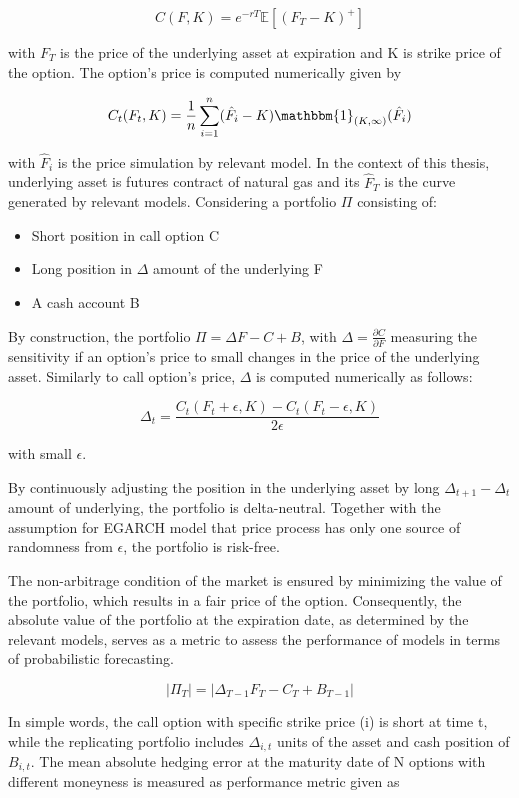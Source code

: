 \documentclass[12pt,a4paper]{article}
\numberwithin{equation}{section}
\begin{document}
\[C(F, K) = e^{-rT} \mathbb{E} \left[(F_T - K)^+ \right] \]

with $F_T$ is the price of the underlying asset at expiration and K is strike price of the option. The option's price is computed numerically given by

\[C_t(F_t, K) = \frac{1}{n} \sum_{i=1}^n (\hat{F}_i  - K)\mathbbm{1}_{(K, \infty)}(\hat{F}_i) \]

with $\hat{F}_i$ is the price simulation by relevant model.
In the context of this thesis, underlying asset is futures contract of natural gas and its $\hat{F}_T$ is the curve generated by relevant models. Considering a portfolio $\Pi$ consisting of: 

\begin{itemize}
\item Short position in call option C
\item Long position in $\Delta$ amount of the underlying F
\item A cash account B
\end{itemize}

By construction, the portfolio $\Pi = \Delta F - C + B$, with $\Delta = \frac{\partial C}{\partial F}$ measuring the sensitivity if an option's price to small changes in the price of the underlying asset. Similarly to call option's price, $\Delta$ is computed numerically as follows:

\[\Delta_t = \frac{C_t(F_t+\epsilon, K) - C_t(F_t - \epsilon, K)}{2\epsilon}\] 

with small $\epsilon$.

By continuously adjusting the position in the underlying asset by long $\Delta_{t+1} - \Delta_t$ amount of underlying, the portfolio is delta-neutral. Together with the assumption for EGARCH model that price process has only one source of randomness from $\epsilon$, the portfolio is risk-free. 

The non-arbitrage condition of the market is ensured by minimizing the value of the portfolio, which results in a fair price of the option. Consequently, the absolute value of the portfolio at the expiration date, as determined by the relevant models, serves as a metric to assess the performance of models in terms of probabilistic forecasting. 

\[|\Pi_T| = |\Delta_{T-1} F_T - C_T + B_{T-1}|\]



In simple words, the call option with specific strike price (i) is short at time t, while the replicating portfolio includes $\Delta _{i,t}$ units of the asset and cash position of $B_{i,t}$. The mean absolute hedging error at the maturity date of N options with different moneyness is measured as performance metric given as
\end{document}
